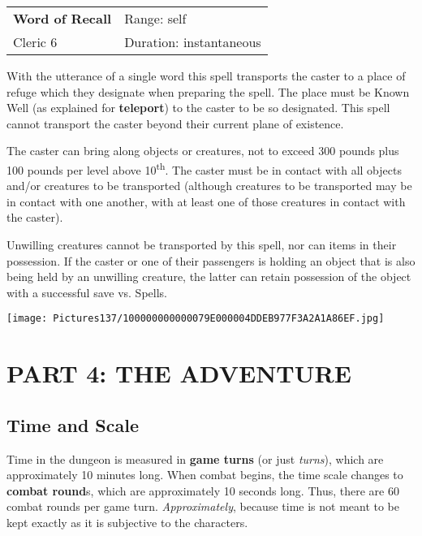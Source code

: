 \documentclass[a4paper,twoside,openany,10pt]{book}
\begin{document}
\begin{multicols}{2}
\smallskip\begin{flushleft} 
	\begin{tabularx}{0.45\textwidth}{@{}m{3.5cm}m{5.5cm}@{}} 
		\textbf{Word of Recall} & Range: self\\
Cleric 6 &Duration: instantaneous\\
	\end{tabularx}\end{flushleft}

With the utterance of a single word this spell transports the caster to a place of refuge which they designate when preparing the spell. The place must be Known Well (as explained for \textbf{teleport}) to the caster to be so designated. This spell cannot transport the caster beyond their current plane of existence.

The caster can bring along objects or creatures, not to exceed 300 pounds plus 100 pounds per level above 10\textsuperscript{th}. The caster must be in contact with all objects and/or creatures to be transported (although creatures to be transported may be in contact with one another, with at least one of those creatures in contact with the caster).

Unwilling creatures cannot be transported by this spell, nor can items in their possession. If the caster or one of their passengers is holding an object that is also being held by an unwilling creature, the latter can retain possession of the object with a successful save vs. Spells. 

\end{multicols}

\vfill

\begin{center}
	\texttt{[image: Pictures137/100000000000079E000004DDEB977F3A2A1A86EF.jpg]}
\end{center}

\pagebreak

\section{PART 4: THE ADVENTURE}\label{part-4-the-adventure}

\subsection{Time and Scale}\label{time-and-scale}

Time in the dungeon is measured in \textbf{game turns} (or just \emph{turns}), which are approximately 10 minutes long. When combat begins, the time scale changes to \textbf{combat round}s, which are approximately 10 seconds long. Thus, there are 60 combat rounds per game turn. \emph{Approximately}, because time is not meant to be kept exactly as it is subjective to the characters.
\end{document}
